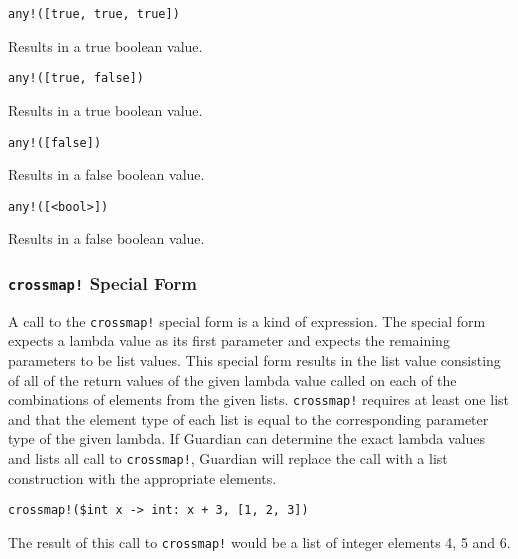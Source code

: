 {{		\begin{itemize}
		{
			\item[] \lstinline[language=MAIA, columns=fixed]@any!([true, true, true])@
			
				Results in a true boolean value.
			
			\item[] \lstinline[language=MAIA, columns=fixed]@any!([true, false])@
			
				Results in a true boolean value.
			
			\item[] \lstinline[language=MAIA, columns=fixed]@any!([false])@
			
				Results in a false boolean value.
			
			\item[] \lstinline[language=MAIA, columns=fixed]@any!([<bool>])@
			
				Results in a false boolean value.
		}
		\end{itemize}
	}
	
	\subsubsection{\lstinline[language=MAIA, columns=fixed]@crossmap!@ Special Form}
	{
		A call to the \lstinline[language=MAIA, columns=fixed]@crossmap!@ special form is a kind of expression.
		The special form expects a lambda value as its
		first parameter and expects the remaining parameters to be list values.
		This special form results in the list value consisting
		of all of the return values of the given lambda value called on each of
		the combinations of elements from the given lists.
		\lstinline[language=MAIA, columns=fixed]@crossmap!@ requires at least one list and that
		the element type of each list is equal to the corresponding parameter type
		of the given lambda.
		If Guardian can determine the exact lambda values and lists all call to
		\lstinline[language=MAIA, columns=fixed]@crossmap!@, Guardian will replace the call with a list
		construction with the appropriate elements.
		
		\begin{itemize}
		{
			\item[] \lstinline[language=MAIA, columns=fixed]@crossmap!($int x -> int: x + 3, [1, 2, 3])@
			
				The result of this call to \lstinline[language=MAIA, columns=fixed]@crossmap!@ would be a list of
				integer elements 4, 5 and 6.
			
}
\end{itemize}}}
